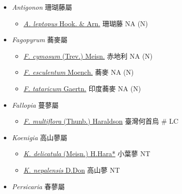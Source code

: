 
  \begin{itemize}
 \item[] \textit{Antigonon} 珊瑚藤屬
                                
  \begin{itemize}
        \item[] \href{http://www.theplantlist.org/tpl1.1/search?q=Antigonon+leptopus}{\textit{A. leptopus} Hook. \& Arn.}   珊瑚藤   NA (N)
  \end{itemize}
 \item[] \textit{Fagopyrum} 蕎麥屬
                                
  \begin{itemize}
        \item[] \href{http://www.theplantlist.org/tpl1.1/search?q=Fagopyrum+cymosum}{\textit{F. cymosum} (Trev.) Meisn.}   赤地利   NA (N)
        \item[] \href{http://www.theplantlist.org/tpl1.1/search?q=Fagopyrum+esculentum}{\textit{F. esculentum} Moench.}   蕎麥   NA (N)
        \item[] \href{http://www.theplantlist.org/tpl1.1/search?q=Fagopyrum+tataricum}{\textit{F. tataricum} Gaertn.}   印度蕎麥   NA (N)
  \end{itemize}
 \item[] \textit{Fallopia} 蔓蓼屬
                                
  \begin{itemize}
        \item[] \href{http://www.theplantlist.org/tpl1.1/search?q=Fallopia+multiflora}{\textit{F. multiflora} (Thunb.) Haraldson}   臺灣何首烏  \# LC
  \end{itemize}
 \item[] \textit{Koenigia} 高山蓼屬
                                
  \begin{itemize}
        \item[] \href{http://www.theplantlist.org/tpl1.1/search?q=Koenigia+delicatula}{\textit{K. delicatula} (Meisn.) H.Hara*}   小葉蓼   NT
        \item[] \href{http://www.theplantlist.org/tpl1.1/search?q=Koenigia+nepalensis}{\textit{K. nepalensis} D.Don}   高山蓼   NT
  \end{itemize}
 \item[] \textit{Persicaria} 春蓼屬
                                

\end{itemize}
